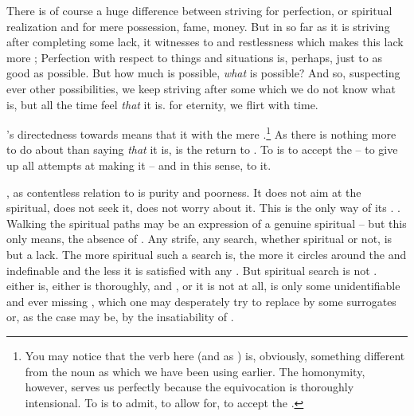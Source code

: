 \pa There is of course a huge difference between striving for
perfection, or spiritual realization and for mere possession, fame,
money. But in so far as it is striving after completing some lack, it
witnesses to and  restlessness which makes this lack
more ; Perfection with respect to  things and
situations is, perhaps, just to  as good as possible. But how
much is possible, {\em what} is possible?  And so, suspecting ever
other possibilities, we keep striving after some  which we do
not know what is, but all the time feel {\em that} it is.
 for eternity, we flirt with time. 


\pa {}'s directedness towards  means that it
 with the mere .\footnote{You may notice that the
verb  here (and  as ) is,
obviously, something different from the noun  as
which we have been using earlier. The homonymity,
however, serves us perfectly because the equivocation is thoroughly
intensional. To  is to admit, to allow for, to accept the
.} As there is nothing more to do about  than
saying {\em that} it is,  is the  return to
. To  is to accept the
 -- to give up all attempts at
making it  -- and in this sense, to  it. 

\label{pa:forget}

, as contentless relation to  is purity and
poorness. It does not aim at the spiritual, does not seek it, does not
worry about it. This is the only way of its .
. 
Walking the spiritual paths may be an expression of a genuine
spiritual  -- but this only means, the absence of
.   Any strife, any search, whether spiritual
or not, is but a lack. The more spiritual such a search is, the more
it circles around the  and indefinable  and the
less it is satisfied with any .  But spiritual search is not
.  either is, either is thoroughly,
 and , or it is not at all, is
only some unidentifiable and ever missing , which one may
desperately try to replace by some  surrogates or, as the case
may be, by the insatiability of .


